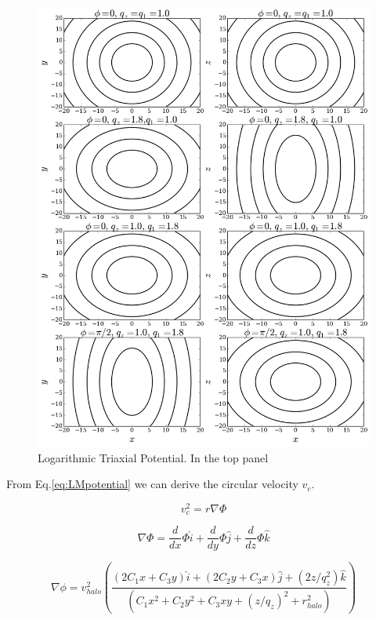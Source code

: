 \begin{figure}
\includegraphics[scale=0.5]{../figures/triaxial_potential.png}
\caption{Logarithmic Triaxial Potential. In the top panel}
\label{fig:Logarithmic}
\end{figure}



From Eq.\ref{eq:LMpotential} we can derive the circular velocity $v_c$.

\begin{equation}
v_c^2 = r \nabla  \Phi 
\end{equation}

\begin{equation}
\nabla \Phi = \dfrac{d}{dx} \Phi \hat{i} + \dfrac{d}{dy} \Phi \hat{j} + \dfrac{d}{dz} \Phi \hat{k}
\end{equation}

\begin{equation}
\nabla \phi = v_{halo}^2  \left( \dfrac{(2C_1x + C_3 y)\hat{i} + (2C_2y + C_3x)\hat{j} + (2z/q_z^2)\hat{k}}{(C_1 x^2 + C_2 y^2 + C_3 x y + (z/q_z)^2 + r_{halo}^2)}    \right)
\end{equation}

